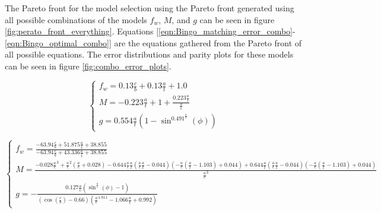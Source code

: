 The Pareto front for the model selection using the Pareto front generated using all possible combinations of the models $f_w$, $M$, and $g$ can be seen in figure \ref{fig:perato_front_everything}. Equations [\ref{eqn:Bingo_matching_error_combo}-\ref{eqn:Bingo_optimal_combo}] are the equations gathered from the Pareto front of all possible equations. The error distributions and parity plots for these models can be seen in figure \ref{fig:combo_error_plots}.

\begin{equation} \label{eqn:Bingo_matching_error_combo}
    \begin{cases}
        f_w = 0.13 \frac{c}{b} + 0.13 \frac{a}{t} + 1.0
        \\
        M = - 0.223 \frac{a}{t} + 1 + \frac{0.223 \frac{a}{t}}{\frac{a}{c}}
        \\
        g = 0.554 \frac{a}{t} \left(1 - \sin^{0.491^{\frac{a}{c}}}{\left(\phi \right)}\right)
    \end{cases}
\end{equation}

\begin{equation} \label{eqn:Bingo_matching_complexity_combo}
    \begin{cases}
        f_w = \frac{- 63.94 \frac{c}{b} + 51.875 \frac{a}{t} + 38.855}{- 63.94 \frac{c}{b} + 43.336 \frac{a}{t} + 38.855}
        \\
        M = \frac{- 0.028 \frac{a}{c}^{3} + \frac{a}{c}^{2} \left(\frac{a}{c} + 0.028\right) - 0.644 \frac{a}{c} \frac{a}{t} \left(\frac{a}{c} \frac{a}{t} - 0.044\right) \left(- \frac{a}{c} \left(\frac{a}{t} - 1.103\right) + 0.044\right) + 0.644 \frac{a}{t} \left(\frac{a}{c} \frac{a}{t} - 0.044\right) \left(- \frac{a}{c} \left(\frac{a}{t} - 1.103\right) + 0.044\right)}{\frac{a}{c}^{3}}
        \\
        g = - \frac{0.127 \frac{a}{c} \left(\sin^{\frac{a}{t}}{\left(\phi \right)} - 1\right)}{\left(\cos{\left(\frac{c}{b} \right)} - 0.66\right) \left(\frac{a}{c}^{1.811} - 1.066 \frac{a}{t} + 0.992\right)}
    \end{cases}
\end{equation}

